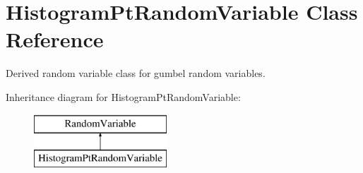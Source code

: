 \section{Histogram\+Pt\+Random\+Variable Class Reference}
\label{classPecos_1_1HistogramPtRandomVariable}


Derived random variable class for gumbel random variables.  


Inheritance diagram for Histogram\+Pt\+Random\+Variable\+:\begin{figure}[H]
\begin{center}
\leavevmode
\includegraphics[height=2.000000cm]{classPecos_1_1HistogramPtRandomVariable}
\end{center}
\end{figure}
